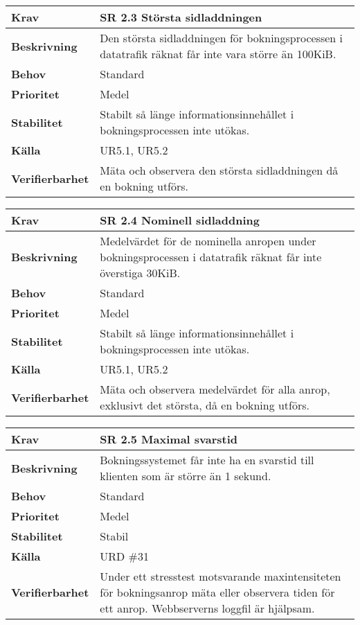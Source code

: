 \documentclass[a4paper, twoside, 11pt, titlepage]{article}
\begin{document}
\begin{tabular} { p{2.6cm} p{12.5cm} }
	\hline
	\sffamily\textbf{Krav} & \sffamily\textbf{SR 2.3 Största sidladdningen } \\
	\hline
	\sffamily\textbf{Beskrivning} & Den största sidladdningen för bokningsprocessen i datatrafik räknat får inte vara större än 100KiB.  \\
	\hline
	\sffamily\textbf{Behov} & Standard  \\
	\hline
	\sffamily\textbf{Prioritet} & Medel  \\
	\hline
	\sffamily\textbf{Stabilitet} & Stabilt så länge informationsinnehållet i bokningsprocessen inte utökas.  \\
	\hline
	\sffamily\textbf{Källa} & UR5.1, UR5.2  \\
	\hline
	\sffamily\textbf{Verifierbarhet} & Mäta och observera den största sidladdningen då en bokning utförs.  \\
	\hline
\end{tabular}
\vspace{6mm}

\begin{tabular} { p{2.6cm} p{12.5cm} }
	\hline
	\sffamily\textbf{Krav} & \sffamily\textbf{SR 2.4 Nominell sidladdning } \\
	\hline
	\sffamily\textbf{Beskrivning} & Medelvärdet för de nominella anropen under bokningsprocessen i datatrafik räknat får inte överstiga 30KiB.  \\
	\hline
	\sffamily\textbf{Behov} & Standard  \\
	\hline
	\sffamily\textbf{Prioritet} & Medel  \\
	\hline
	\sffamily\textbf{Stabilitet} & Stabilt så länge informationsinnehållet i bokningsprocessen inte utökas.  \\
	\hline
	\sffamily\textbf{Källa} & UR5.1, UR5.2  \\
	\hline
	\sffamily\textbf{Verifierbarhet} & Mäta och observera medelvärdet för alla anrop, exklusivt det största, då en bokning utförs.  \\
	\hline
\end{tabular}
\vspace{6mm}

\begin{tabular} { p{2.6cm} p{12.5cm} }
	\hline
	\sffamily\textbf{Krav} & \sffamily\textbf{SR 2.5 Maximal svarstid } \\
	\hline
	\sffamily\textbf{Beskrivning} & Bokningssystemet får inte ha en svarstid till klienten som är större än 1 sekund.  \\
	\hline
	\sffamily\textbf{Behov} & Standard  \\
	\hline
	\sffamily\textbf{Prioritet} & Medel  \\
	\hline
	\sffamily\textbf{Stabilitet} & Stabil  \\
	\hline
	\sffamily\textbf{Källa} & URD \#31  \\
	\hline
	\sffamily\textbf{Verifierbarhet} & Under ett stresstest motsvarande maxintensiteten för bokningsanrop mäta eller observera tiden för ett anrop. Webbserverns loggfil är hjälpsam.  \\
	\hline
\end{tabular}
\end{document}
